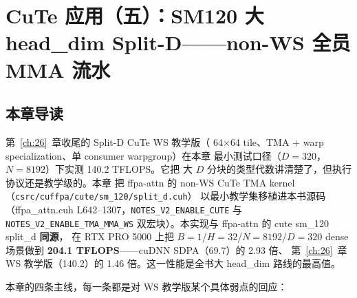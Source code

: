 \chapter{CuTe 应用（五）：SM120 大 head\_dim Split-D——non-WS 全员 MMA 流水}\label{ch:26c}

\section{本章导读}

第~\ref{ch:26}~章收尾的 Split-D CuTe WS 教学版（
64$\times$64 tile、TMA + warp specialization、单 consumer warpgroup）在本章
最小测试口径（$D{=}320$，$N{=}8192$）下实测 140.2 TFLOPS。它把
大 $D$ 分块的类型代数讲清楚了，但执行协议还是教学级的。本章
把 ffpa-attn 的 non-WS CuTe TMA kernel（\texttt{csrc/cuffpa/cute/sm\_120/split\_d.cuh}）
以最小教学集移植进本书源码（ffpa\_attn.cuh L642--1307，\texttt{NOTES\_\allowbreak{}V2\_\allowbreak{}ENABLE\_\allowbreak{}CUTE}
与 \texttt{NOTES\_\allowbreak{}V2\_\allowbreak{}ENABLE\_\allowbreak{}TMA\_\allowbreak{}MMA\_\allowbreak{}WS}
双宏块）。本实现与 ffpa-attn 的 cute sm\_120 split\_d \textbf{同源}，
在 RTX PRO 5000 上把 $B{=}1$/$H{=}32$/$N{=}8192$/$D{=}320$
dense 场景做到 \textbf{204.1 TFLOPS}——cuDNN SDPA（69.7）的 2.93 倍、
第~\ref{ch:26}~章 WS 教学版（140.2）的 1.46 倍。这一性能是全书大 head\_dim 路线的最高值。

本章的四条主线，每一条都是对 WS 教学版某个具体弱点的回应：

